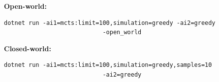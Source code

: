 \textbf{Open-world: }
\begin{lstlisting}
dotnet run -ai1=mcts:limit=100,simulation=greedy -ai2=greedy 
							-open_world
\end{lstlisting}

\textbf{Closed-world: }
\begin{lstlisting}
dotnet run -ai1=mcts:limit=100,simulation=greedy,samples=10 
							-ai2=greedy
\end{lstlisting}





